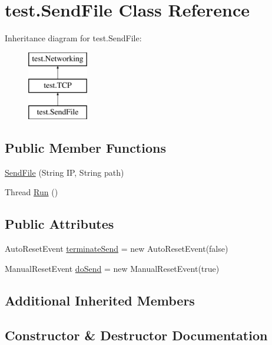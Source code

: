 \hypertarget{classtest_1_1_send_file}{}\section{test.\+Send\+File Class Reference}
\label{classtest_1_1_send_file}
Inheritance diagram for test.\+Send\+File\+:\begin{figure}[H]
\begin{center}
\leavevmode
\includegraphics[height=3.000000cm]{classtest_1_1_send_file}
\end{center}
\end{figure}
\subsection*{Public Member Functions}
\begin{DoxyCompactItemize}
\item 
\hyperlink{classtest_1_1_send_file_aadf551327623e5d04f72897784da02b0}{Send\+File} (String IP, String path)
\item 
Thread \hyperlink{classtest_1_1_send_file_a9fcd25dfb3e11e2512a780040e428a08}{Run} ()
\end{DoxyCompactItemize}
\subsection*{Public Attributes}
\begin{DoxyCompactItemize}
\item 
Auto\+Reset\+Event \hyperlink{classtest_1_1_send_file_a8f583dc003c57894baff2e2fc2fdecfa}{terminate\+Send} = new Auto\+Reset\+Event(false)
\item 
Manual\+Reset\+Event \hyperlink{classtest_1_1_send_file_ae58280cbf1cac439f5013b6ec1dbd984}{do\+Send} = new Manual\+Reset\+Event(true)
\end{DoxyCompactItemize}
\subsection*{Additional Inherited Members}


\subsection{Constructor \& Destructor Documentation}
\mbox{\label{classtest_1_1_send_file_aadf551327623e5d04f72897784da02b0}} 
